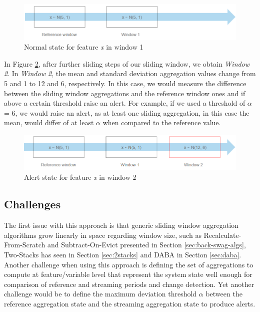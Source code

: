 \begin{figure}[!htb]
    \begin{center}
      \includegraphics[scale=0.65]{figures/approach2-normality.png}
      \caption[]{Normal state for feature \textit{x} in window 1}
      \label{fig:approach2-initial-state}
    \end{center}
\end{figure}


In Figure \ref{fig:approach2-alert-state}, after further sliding steps of our sliding window, we obtain \textit{Window 2}. In \textit{Window 2}, the mean and standard deviation aggregation values change from 5 and 1 to 12 and 6, respectively. In this case, we would measure the difference between the sliding window aggregations and the reference window ones and if above a certain threshold raise an alert. For example, if we used a threshold of $\alpha$ = 6, we would raise an alert, as at least one sliding aggregation, in this case the mean, would differ of at least $\alpha$ when compared to the reference value.

\begin{figure}[!htb]
    \begin{center}
      \includegraphics[scale=0.65]{figures/approach2-alert.png}
      \caption[]{Alert state for feature \textit{x} in window 2}
      \label{fig:approach2-alert-state}
    \end{center}
\end{figure}

\subsection*{Challenges}
The first issue with this approach is that generic sliding window aggregation algorithms grow linearly in space regarding window size, such as Recalculate-From-Scratch and Subtract-On-Evict presented in Section \ref{sec:back-swag-algs}, Two-Stacks has seen in Section \ref{sec:2stacks} and DABA in Section \ref{sec:daba}. Another challenge when using this approach is defining the set of aggregations to compute at feature/variable level that represent the system state well enough for comparison of reference and streaming periods and change detection. Yet another challenge would be to define the maximum deviation threshold $\alpha$  between the reference aggregation state and the streaming aggregation state to produce alerts.



